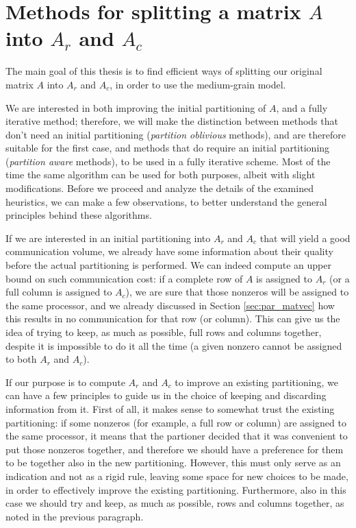 \chapter{Methods for splitting a matrix $A$ into $A_r$ and $A_c$} \label{chap:methods}

The main goal of this thesis is to find efficient ways of splitting our original matrix $A$ into $A_r$ and $A_c$, in order to use the medium-grain model.

We are interested in both improving the initial partitioning of $A$, and a fully iterative method; therefore, we will make the distinction between methods that don't need an initial partitioning (\emph{partition oblivious} methods), and are therefore suitable for the first case, and methods that do require an initial partitioning (\emph{partition aware} methods), to be used in a fully iterative scheme. Most of the time the same algorithm can be used for both purposes, albeit with slight modifications.  Before we proceed and analyze the details of the examined heuristics, we can make a few observations, to better understand the general principles behind these algorithms.

If we are interested in an initial partitioning into $A_r$ and $A_c$ that will yield a good communication volume, we already have some information about their quality before the actual partitioning is performed. We can indeed compute an upper bound on such communication cost: if a complete row of $A$ is assigned to $A_r$ (or a full column is assigned to $A_c$), we are sure that those nonzeros will be assigned to the same processor, and we already discussed in Section \ref{sec:par_matvec} how this results in no communication for that row (or column). This can give us the idea of trying to keep, as much as possible, full rows and columns together, despite it is impossible to do it all the time (a given nonzero cannot be assigned to both $A_r$ and $A_c$).

If our purpose is to compute $A_r$ and $A_c$ to improve an existing partitioning, we can have a few principles to guide us in the choice of keeping and discarding information from it. First of all, it makes sense to somewhat trust the existing partitioning: if some nonzeros (for example, a full row or column) are assigned to the same processor, it means that the partioner decided that it was convenient to put those nonzeros together, and therefore we should have a preference for them to be together also in the new partitioning. However, this must only serve as an indication and not as a rigid rule, leaving some space for new choices to be made, in order to effectively improve the existing partitioning. Furthermore, also in this case we should try and keep, as much as possible, rows and columns together, as noted in the previous paragraph.

